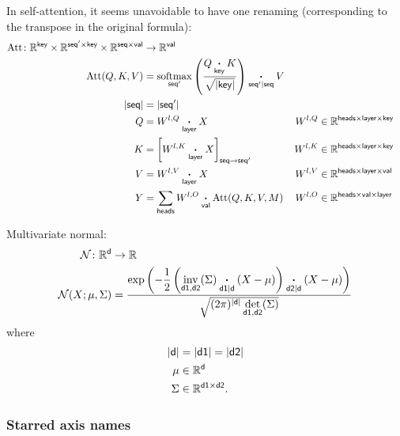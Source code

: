 In self-attention, it seems unavoidable to have one renaming (corresponding to the transpose in the original formula):
\begin{align*}
  \text{Att} \colon \mathbb{R}^{\name{key}} \times \mathbb{R}^{\name{seq'} \times\name{key}} \times \mathbb{R}^{\name{seq} \times\name{val}} &\rightarrow \mathbb{R}^{\name{val}} \\
  \text{Att}(Q,K,V) &= \nfun{seq'}{softmax} \left( \frac{Q \ndot{key} K}{\sqrt{|\name{key}|}} \right) \nndot{seq'}{seq} V \\
  |\name{seq}| &= |\name{seq'}| \\
  Q &= W^{l,Q} \ndot{layer} X & W^{l,Q} &\in \mathbb{R}^{\name{heads} \times \name{layer} \times \name{key}} \\
  K &= \nmov{seq}{seq'}{W^{l,K} \ndot{layer} X} & W^{l,K} &\in \mathbb{R}^{\name{heads} \times \name{layer} \times \name{key}} \\
  V &= W^{l,V} \ndot{layer} X & W^{l,V} &\in \mathbb{R}^{\name{heads} \times \name{layer} \times \name{val}} \\
  Y &= \nsum{heads} W^{l,O} \ndot{val} \text{Att}(Q, K, V, M) & W^{l,O} &\in \mathbb{R}^{\name{heads} \times \name{val} \times \name{layer}}
\end{align*}

Multivariate normal:
\begin{align*}
\mathcal{N} \colon \reals^{\name{d}} &\rightarrow \reals \\
\mathcal{N}(X; \mu, \Sigma) &= \frac{\displaystyle \exp\left(-\frac{1}{2}  \left(\nfun{d1, d2}{inv}(\Sigma) \nndot{d1}{d} (X - \mu) \right) \nndot{d2}{d} (X - \mu) \right)}{\sqrt{(2 \pi)^{|\name{d}|} \nfun{d1, d2}{det}(\Sigma)}}
\end{align*}
where
\begin{align*}
|\name{d}| &= |\name{d1}| = |\name{d2}| \\
\mu &\in \reals^{\name{d}} \\
\Sigma & \in \reals^{\name{d1} \times \name{d2}}.
\end{align*}

\subsubsection{Starred axis names}

